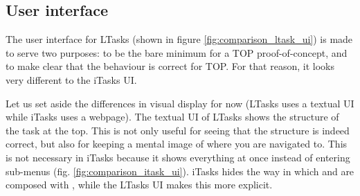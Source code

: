 \subsection{User interface}
The user interface for LTasks (shown in figure \ref{fig:comparison_ltask_ui}) is made to serve two purposes: to be the bare minimum for a TOP proof-of-concept, and to make clear that the behaviour is correct for TOP. For that reason, it looks very different to the iTasks UI.

Let us set aside the differences in visual display for now (LTasks uses a textual UI while iTasks uses a webpage). The textual UI of LTasks shows the structure of the task at the top. This is not only useful for seeing that the structure is indeed correct, but also for keeping a mental image of where you are navigated to. This is not necessary in iTasks because it shows everything at once instead of entering sub-menus (fig. \ref{fig:comparison_itask_ui}). iTasks hides the way in which  and  are composed with , while the LTasks UI makes this more explicit.

